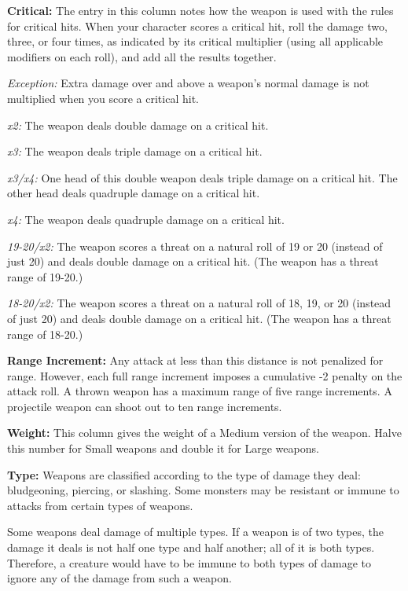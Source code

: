 \vspace{12pt}
\textbf{Critical:} The entry in this column notes how the weapon is used with the 
rules for critical hits. When your character scores a critical hit, roll the damage 
two, three, or four times, as indicated by its critical multiplier (using all applicable 
modifiers on each roll), and add all the results together.

\textit{Exception:} Extra damage over and above a weapon's normal damage is not 
multiplied when you score a critical hit.

\textit{x2:} The weapon deals double damage on a critical hit.

\textit{x3:} The weapon deals triple damage on a critical hit.

\textit{x3/x4:} One head of this double weapon deals triple damage on 
a critical hit. The other head deals quadruple damage on a critical hit.

\textit{x4:} The weapon deals quadruple damage on a critical hit.

\textit{19-20/x2:} The weapon scores a threat on a natural roll of 19 
or 20 (instead of just 20) and deals double damage on a critical hit. (The weapon 
has a threat range of 19-20.)

\textit{18-20/x2:} The weapon scores a threat on a natural roll of 18, 
19, or 20 (instead of just 20) and deals double damage on a critical hit. (The 
weapon has a threat range of 18-20.)

\textbf{Range Increment:} Any attack at less than this distance is not penalized 
for range. However, each full range increment imposes a cumulative -2 penalty on 
the attack roll. A thrown weapon has a maximum range of five range increments. 
A projectile weapon can shoot out to ten range increments.

\textbf{Weight:} This column gives the weight of a Medium version of the weapon. 
Halve this number for Small weapons and double it for Large weapons.

\textbf{Type:} Weapons are classified according to the type of damage they deal: 
bludgeoning, piercing, or slashing. Some monsters may be resistant or immune to 
attacks from certain types of weapons.

Some weapons deal damage of multiple types. If a weapon is of two types, the damage 
it deals is not half one type and half another; all of it is both types. Therefore, 
a creature would have to be immune to both types of damage to ignore any of the 
damage from such a weapon.

